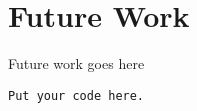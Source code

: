 \chapter{Future Work}

Future work goes here\cite{maven}

\begin{lstlisting}
Put your code here.
\end{lstlisting}
